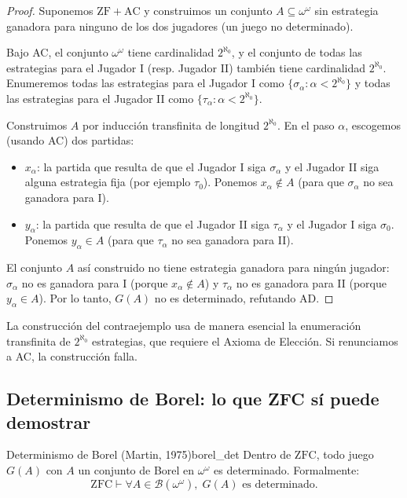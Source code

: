 \begin{proof}
Suponemos $\mathrm{ZF} + \mathrm{AC}$ y construimos un conjunto $A \subseteq \omega^\omega$ sin estrategia ganadora para ninguno de los dos jugadores (un juego no determinado).

Bajo AC, el conjunto $\omega^\omega$ tiene cardinalidad $2^{\aleph_0}$, y el conjunto de todas las estrategias para el Jugador I (resp. Jugador II) también tiene cardinalidad $2^{\aleph_0}$. Enumeremos todas las estrategias para el Jugador I como $\{\sigma_\alpha : \alpha < 2^{\aleph_0}\}$ y todas las estrategias para el Jugador II como $\{\tau_\alpha : \alpha < 2^{\aleph_0}\}$.

Construimos $A$ por inducción transfinita de longitud $2^{\aleph_0}$. En el paso $\alpha$, escogemos (usando AC) dos partidas:
\begin{itemize}[leftmargin=2em]
  \item $x_\alpha$: la partida que resulta de que el Jugador I siga $\sigma_\alpha$ y el Jugador II siga alguna estrategia fija (por ejemplo $\tau_0$). Ponemos $x_\alpha \notin A$ (para que $\sigma_\alpha$ no sea ganadora para I).
  \item $y_\alpha$: la partida que resulta de que el Jugador II siga $\tau_\alpha$ y el Jugador I siga $\sigma_0$. Ponemos $y_\alpha \in A$ (para que $\tau_\alpha$ no sea ganadora para II).
\end{itemize}
El conjunto $A$ así construido no tiene estrategia ganadora para ningún jugador: $\sigma_\alpha$ no es ganadora para I (porque $x_\alpha \notin A$) y $\tau_\alpha$ no es ganadora para II (porque $y_\alpha \in A$). Por lo tanto, $G(A)$ no es determinado, refutando AD.
\end{proof}

\begin{importante}
La construcción del contraejemplo usa de manera esencial la enumeración transfinita de $2^{\aleph_0}$ estrategias, que requiere el Axioma de Elección. Si renunciamos a AC, la construcción falla.
\end{importante}

\subsection{Determinismo de Borel: lo que ZFC sí puede demostrar}

\begin{teorema}{Determinismo de Borel (Martin, 1975)}{borel_det}
Dentro de $\mathrm{ZFC}$, todo juego $G(A)$ con $A$ un conjunto de Borel en $\omega^\omega$ es determinado. Formalmente:
\[
  \mathrm{ZFC} \vdash \forall A \in \mathcal{B}(\omega^\omega),\; G(A) \text{ es determinado.}
\]
\end{teorema}

